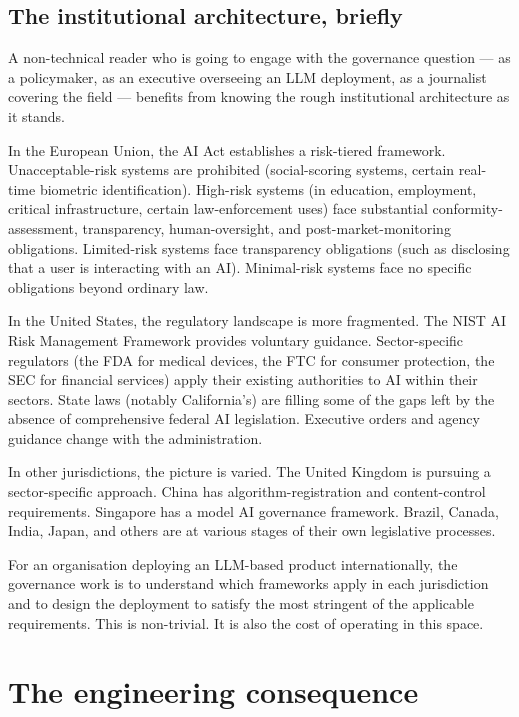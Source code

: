 \subsection*{The institutional architecture, briefly}

A non-technical reader who is going to engage with the
governance question --- as a policymaker, as an executive
overseeing an LLM deployment, as a journalist covering the
field --- benefits from knowing the rough institutional
architecture as it stands.

In the European Union, the AI Act establishes a
risk-tiered framework. Unacceptable-risk systems are
prohibited (social-scoring systems, certain real-time
biometric identification). High-risk systems (in education,
employment, critical infrastructure, certain
law-enforcement uses) face substantial conformity-assessment,
transparency, human-oversight, and post-market-monitoring
obligations. Limited-risk systems face transparency
obligations (such as disclosing that a user is interacting
with an AI). Minimal-risk systems face no specific
obligations beyond ordinary law.

In the United States, the regulatory landscape is more
fragmented. The NIST AI Risk Management Framework provides
voluntary guidance. Sector-specific regulators (the FDA for
medical devices, the FTC for consumer protection, the SEC
for financial services) apply their existing authorities to
AI within their sectors. State laws (notably California's)
are filling some of the gaps left by the absence of
comprehensive federal AI legislation. Executive orders and
agency guidance change with the administration.

In other jurisdictions, the picture is varied. The United
Kingdom is pursuing a sector-specific approach. China has
algorithm-registration and content-control requirements.
Singapore has a model AI governance framework. Brazil,
Canada, India, Japan, and others are at various stages of
their own legislative processes.

For an organisation deploying an LLM-based product
internationally, the governance work is to understand which
frameworks apply in each jurisdiction and to design the
deployment to satisfy the most stringent of the applicable
requirements. This is non-trivial. It is also the cost of
operating in this space.

\section{The engineering consequence}

